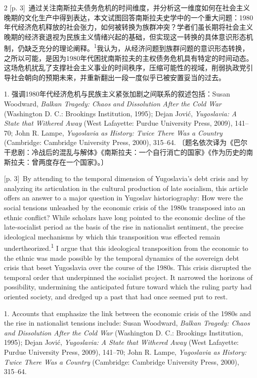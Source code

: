 \documentclass[10pt,a4paper]{article}
\begin{document}
\begin{paracol}{2}
{\scriptsize\color{gray} [p. 3]}\ 通过关注南斯拉夫债务危机的时间维度，并分析这一维度如何在社会主义晚期的文化生产中得到表达，本文试图回答南斯拉夫史学中的一个重大问题：1980年代经济危机释放的社会张力，如何被转换为族群冲突？学者们虽长期将社会主义晚期的经济衰退视为民族主义情绪兴起的基础，但实现这一转换的具体意识形态机制，仍缺乏充分的理论阐\mbox{释。\textsuperscript{1}}我认为，从经济问题到族群问题的意识形态转换，之所以可能，是因为1980年代困扰南斯拉夫的主权债务危机具有特定的时间动态。这场危机扰乱了支撑社会主义事业的时间秩序，压缩可能性的视域，削弱执政党引导社会朝向的预期未来，并重新翻出一段一度似乎已被安置妥当的过去。\par{\small 1. 强调1980年代经济危机与民族主义紧张加剧之间联系的叙述包括：Susan Woodward, \textit{Balkan Tragedy: Chaos and Dissolution After the Cold War} (Washington D. C.: Brookings Institution, 1995); Dejan Jović, \textit{Yugoslavia: A State that Withered Away} (West Lafayette: Purdue University Press, 2009), 141–70; John R. Lampe, \textit{Yugoslavia as History: Twice There Was a Country} (Cambridge: Cambridge University Press, 2000), 315–64. 〔题名依次译为《巴尔干悲剧：冷战后的混乱与解体》《南斯拉夫：一个自行消亡的国家》《作为历史的南斯拉夫：曾两度存在一个国家》。〕\par}
\switchcolumn
{\scriptsize\color{gray} [p. 3]}\ By attending to the temporal dimension of Yugoslavia’s debt crisis and by analyzing its articulation in the cultural production of late socialism, this article offers an answer to a major question in Yugoslav historiography: How were the social tensions unleashed by the economic crisis of the 1980s transposed into an ethnic conflict? While scholars have long pointed to the economic decline of the late-socialist period as the basis of the rise in nationalist sentiment, the precise ideological mechanisms by which this transposition was effected remain undertheorized.\nobreak\textsuperscript{1} I argue that this ideological transposition from the economic to the ethnic was made possible by the temporal dynamics of the sovereign debt crisis that beset Yugoslavia over the course of the 1980s. This crisis disrupted the temporal order that underpinned the socialist project. It narrowed the horizons of possibility, undermining the anticipated future toward which the ruling party had oriented society, and dredged up a past that had once seemed put to rest.\par{\small 1. Accounts that emphasize the link between the economic crisis of the 1980s and the rise in nationalist tensions include: Susan Woodward, \textit{Balkan Tragedy: Chaos and Dissolution After the Cold War} (Washington D. C.: Brookings Institution, 1995); Dejan Jović, \textit{Yugoslavia: A State that Withered Away} (West Lafayette: Purdue University Press, 2009), 141–70; John R. Lampe, \textit{Yugoslavia as History: Twice There Was a Country} (Cambridge: Cambridge University Press, 2000), 315–64.\par}

\end{paracol}
\end{document}
